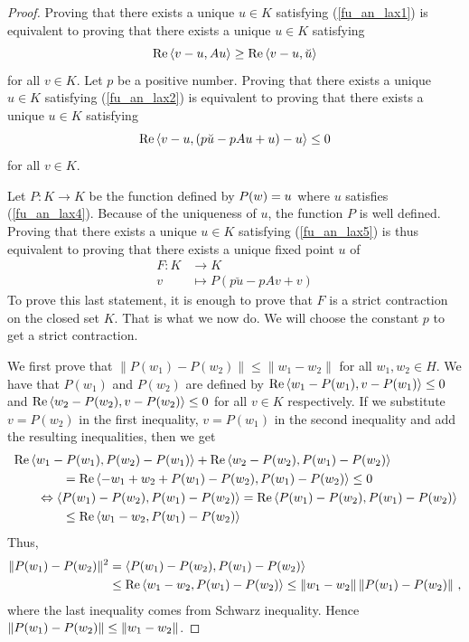 \begin{proof}
Proving that there exists a unique $u\in K$ satisfying 
(\ref{fu_an_lax1}) is equivalent to proving that there exists a unique
$u\in K$ satisfying
\begin{equation} \label{fu_an_lax2}
\operatorname{Re} \left\langle{v-u} , {Au}\right\rangle \geq \operatorname{Re} \left\langle{v-u} , {\breve{u}}\right\rangle
\end{equation}
for all $v \in K$.  Let $p$ be a positive number.  Proving that there
exists a unique $u\in K$ satisfying (\ref{fu_an_lax2}) is equivalent
to proving that there exists a unique $u\in K$ satisfying
\begin{equation} \label{fu_an_lax5}
\operatorname{Re} \left\langle{v-u} , { \left(p\breve{u}-p Au +u\right)-u}\right\rangle \leq 0
\end{equation}
for all $v \in K$.

Let $P:K \rightarrow K$ be the function defined by
$\displaystyle P(w) = u$ where $u$ satisfies (\ref{fu_an_lax4}).
Because of the uniqueness of $u$, the function $P$ is well defined.
Proving that there exists a unique $u\in K$ satisfying
(\ref{fu_an_lax5}) is thus equivalent to proving that there exists a
unique fixed point $u$ of
\begin{align*}
F: K &\rightarrow K \\
 v & \mapsto P(p\breve{u}-p Av +v)
\end{align*}
To prove this last statement, it is enough to prove that $F$ is a
strict contraction on the closed set $K$.  That is what we now do.  We
will choose the constant $p$ to get a strict contraction.

We first prove that $\|P(w_1) - P(w_2) \| \leq \|w_1 - w_2\|$ for all
$w_1, w_2 \in H$.  We have that $P(w_1)$ and $P(w_2)$ are defined by
$\displaystyle \operatorname{Re} \left\langle{w_1- P(w_1)} , {v- P(w_1)}\right\rangle \leq 0$ and
$\displaystyle \operatorname{Re} \left\langle{w_2- P(w_2)} , {v- P(w_2)}\right\rangle \leq 0$
for all $v \in K$ respectively.  If we substitute $v=P(w_2)$ in the
first inequality, $v=P(w_1)$ in the second inequality and add the
resulting inequalities, then we get
\begin{align*}
&\operatorname{Re} \left\langle{w_1- P(w_1)} , {P(w_2)- P(w_1)}\right\rangle + \operatorname{Re} \left\langle{w_2- P(w_2)} , {P(w_1)- P(w_2)}\right\rangle \\
&\qquad \qquad = \operatorname{Re} \left\langle{-w_1 + w_2 + P(w_1) - P(w_2)} , {P(w_1)- P(w_2)}\right\rangle \leq 0 \\
&\qquad \Leftrightarrow
\left\langle{P(w_1) - P(w_2)} , {P(w_1)- P(w_2)}\right\rangle = \operatorname{Re} \left\langle{P(w_1) - P(w_2)} , {P(w_1)- P(w_2)}\right\rangle \\
&\qquad \qquad \leq \operatorname{Re} \left\langle{w_1- w_2} , {P(w_1)- P(w_2)}\right\rangle
\end{align*}
Thus,
\begin{align*}
\|P(w_1) - P(w_2) \|^2 &= \left\langle{P(w_1)- P(w_2)} , {P(w_1)- P(w_2)}\right\rangle \\
& \leq \operatorname{Re} \left\langle{w_1- w_2} , {P(w_1)- P(w_2)}\right\rangle
\leq \|w_1 - w_2 \| \, \|P(w_1) - P(w_2) \| \ ,
\end{align*}
where the last inequality comes from Schwarz inequality.
Hence $\displaystyle \|P(w_1) - P(w_2)\| \leq \| w_1 - w_2 \|$.


\end{proof}
